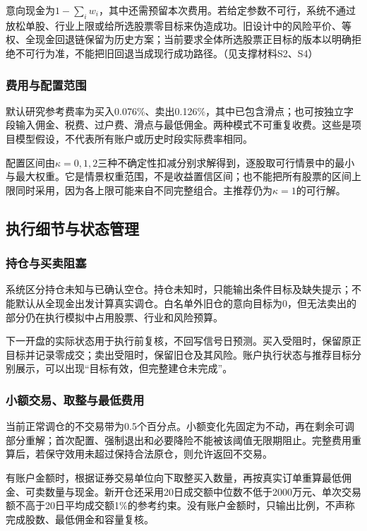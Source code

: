\documentclass[UTF8,12pt,a4paper,fontset=none]{ctexart}
\begin{document}
意向现金为$1-\sum_iw_i$，其中还需预留本次费用。若给定参数不可行，系统不通过放松单股、行业上限或给所选股票零目标来伪造成功。旧设计中的风险平价、等权、全现金回退链保留为历史方案；当前要求全体所选股票正目标的版本以明确拒绝不可行为准，不能把旧回退当成现行成功路径。（见支撑材料S2、S4）


\subsubsection{费用与配置范围}

默认研究参考费率为买入0.076\%、卖出0.126\%，其中已包含滑点；也可按独立字段输入佣金、税费、过户费、滑点与最低佣金。两种模式不可重复收费。这些是项目模型假设，不代表所有账户或历史时段实际费率相同。


配置区间由$\kappa=0,1,2$三种不确定性扣减分别求解得到，逐股取可行情景中的最小与最大权重。它是情景权重范围，不是收益置信区间；也不能把所有股票的区间上限同时采用，因为各上限可能来自不同完整组合。主推荐仍为$\kappa=1$的可行解。


\subsection{执行细节与状态管理}

\subsubsection{持仓与买卖阻塞}

系统区分持仓未知与已确认空仓。持仓未知时，只能输出条件目标及缺失提示；不能默认从全现金出发计算真实调仓。白名单外旧仓的意向目标为0，但无法卖出的部分仍在执行模拟中占用股票、行业和风险预算。


下一开盘的实际状态用于执行前复核，不回写信号日预测。买入受阻时，保留原正目标并记录零成交；卖出受阻时，保留旧仓及其风险。账户执行状态与推荐目标分别展示，可以出现“目标有效，但完整建仓未完成”。


\subsubsection{小额交易、取整与最低费用}

当前正常调仓的不交易带为0.5个百分点。小额变化先固定为不动，再在剩余可调部分重解；首次配置、强制退出和必要降险不能被该阈值无限期阻止。完整费用重算后，若保守效用未超过保持合法原仓，则允许返回不交易。


有账户金额时，根据证券交易单位向下取整买入数量，再按真实订单重算最低佣金、可卖数量与现金。新开仓还采用20日成交额中位数不低于2000万元、单次交易额不高于20日平均成交额1\%的参考约束。没有账户金额时，只输出比例，不声称完成股数、最低佣金和容量复核。
\end{document}
